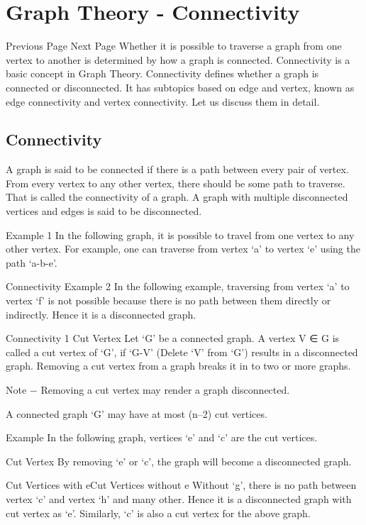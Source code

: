 \section{Graph Theory - Connectivity}

 
 Previous Page Next Page  
Whether it is possible to traverse a graph from one vertex to another is determined by how a graph is connected. Connectivity is a basic concept in Graph Theory. Connectivity defines whether a graph is connected or disconnected. It has subtopics based on edge and vertex, known as edge connectivity and vertex connectivity. Let us discuss them in detail.

\subsection{Connectivity}
A graph is said to be connected if there is a path between every pair of vertex. From every vertex to any other vertex, there should be some path to traverse. That is called the connectivity of a graph. A graph with multiple disconnected vertices and edges is said to be disconnected.

Example 1
In the following graph, it is possible to travel from one vertex to any other vertex. For example, one can traverse from vertex ‘a’ to vertex ‘e’ using the path ‘a-b-e’.

Connectivity
Example 2
In the following example, traversing from vertex ‘a’ to vertex ‘f’ is not possible because there is no path between them directly or indirectly. Hence it is a disconnected graph.

Connectivity 1
Cut Vertex
Let ‘G’ be a connected graph. A vertex V ∈ G is called a cut vertex of ‘G’, if ‘G-V’ (Delete ‘V’ from ‘G’) results in a disconnected graph. Removing a cut vertex from a graph breaks it in to two or more graphs.

Note − Removing a cut vertex may render a graph disconnected.

A connected graph ‘G’ may have at most (n–2) cut vertices.

Example
In the following graph, vertices ‘e’ and ‘c’ are the cut vertices.

Cut Vertex
By removing ‘e’ or ‘c’, the graph will become a disconnected graph.

Cut Vertices with eCut Vertices without e
Without ‘g’, there is no path between vertex ‘c’ and vertex ‘h’ and many other. Hence it is a disconnected graph with cut vertex as ‘e’. Similarly, ‘c’ is also a cut vertex for the above graph.

